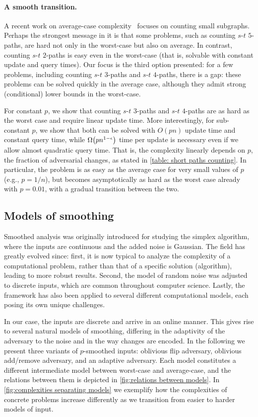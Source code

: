 \documentclass[letter,11pt]{article}
\newcommand{\paths}[3]{${#1}$-${#2}$ ${#3}$-paths\xspace}
\begin{document}
\vspace{15mm} %
\paragraph{A smooth transition.}
A recent work on average-case complexity~\cite{HLS22}
focuses on counting small subgraphs.
Perhaps the strongest message in it is that some problems, such as counting \paths st5, are hard not only in the worst-case but also on average. 
In contrast, counting \paths{s}{t}{2} is easy even in the worst-case (that is, solvable with constant update and query times).
Our focus is the third option presented: for a few problems, including counting \paths{s}{t}{3} and \paths{s}{t}{4}, there is a gap: these problems can be solved quickly in the average case, although they admit strong (conditional) lower bounds in the worst-case.

For constant $p$, we show that  counting \paths{s}{t}{3} and \paths{s}{t}{4} 
are as hard as the worst case and require linear update time. 
More interestingly, for sub-constant $p$, we show that both can be solved with $O(pn)$ update time and constant query time, 
while $\Omega\left(pn^{1-\eps}\right)$ time per update is necessary even if we allow almost quadratic query time.
That is, the complexity linearly depends on $p$, the 
fraction of adversarial changes, as stated in \cref{table: short paths counting}.
In particular, the problem is as easy as the average case for very small values of $p$ (e.g., $p=1/n$), but becomes asymptotically as hard as the worst case already with $p=0.01$, with a gradual transition between the two.


\subsection{Models of smoothing}
\label{sec:intro-models}
Smoothed analysis was originally introduced for studying the simplex algorithm, where the inputs are continuous and the added noise is Gaussian.
The field has greatly evolved since: first, it is now typical to analyze the complexity of a computational problem, rather than that of a specific solution (algorithm), leading to more robust results.
Second, the model of random noise was adjusted to discrete inputs, which are common throughout computer science.
Lastly, the framework has also been applied to several different computational models, each posing its own unique challenges.

In our case, the inputs are discrete and arrive in an online manner. 
This gives rise to several natural models of smoothing, differing in the adaptivity of the adversary to the noise and in the way changes are encoded.
In the following we present three variants of $p$-smoothed inputs:
oblivious flip adversary,
oblivious add/remove adversary, 
and an adaptive adversary.
Each model constitutes a different intermediate model between worst-case and average-case, and the relations between them is depicted in \cref{fig:relations between models}.
In \cref{fig:complexities separating models} 
we exemplify how the complexities of concrete problems increase differently as we transition from easier to harder models of input.
\end{document}
